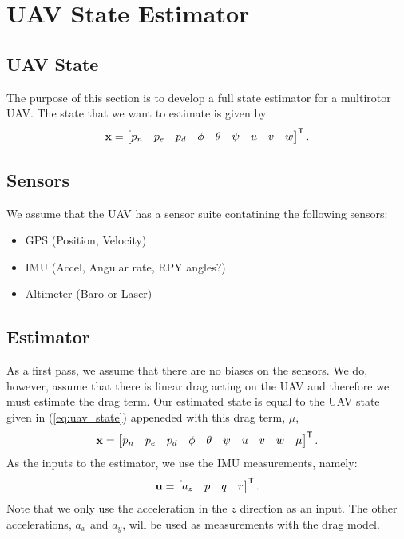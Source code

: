
\section{UAV State Estimator}
\subsection{UAV State}
The purpose of this section is to develop a full state estimator for a
multirotor UAV. The state that we want to estimate is given by
\begin{equation}
  \boldsymbol{\mathrm{x}} =
  \begin{bmatrix}
    p_n & p_e & p_d &
    \phi & \theta & \psi &
    u & v & w
  \end{bmatrix}^{\mathsf{T}}.
\label{eq:uav_state}
\end{equation}

\subsection{Sensors}
We assume that the UAV has a sensor suite contatining the following sensors:
\begin{itemize}
  \item GPS (Position, Velocity)
  \item IMU (Accel, Angular rate, RPY angles?)
  \item Altimeter (Baro or Laser)
\end{itemize}

\subsection{Estimator}
As a first pass, we assume that there are no biases on the sensors. We do,
however, assume that there is linear drag acting on the UAV and therefore
we must estimate the drag term. Our estimated state is equal to the UAV state
given in (\ref{eq:uav_state}) appeneded with this drag term, $\mu$,
\begin{equation}
  \boldsymbol{\mathrm{x}} =
  \begin{bmatrix}
    p_n & p_e & p_d &
    \phi & \theta & \psi &
    u & v & w &
    \mu
  \end{bmatrix}^{\mathsf{T}}.
\label{eq:est_state}
\end{equation}
As the inputs to the estimator, we use the IMU measurements, namely:
\begin{equation}
  \boldsymbol{\mathrm{u}} =
  \begin{bmatrix}
    a_z &
    p & q & r
  \end{bmatrix}^{\mathsf{T}}.
\label{eq:est_inputs}
\end{equation}
Note that we only use the acceleration in the $z$ direction as an input. The
other accelerations, $a_x$ and $a_y$, will be used as measurements with the drag
model.

